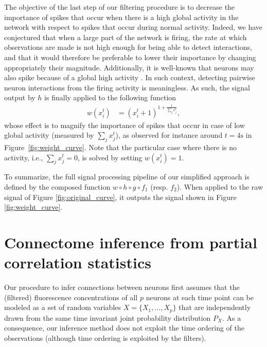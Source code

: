 \documentclass[wcp]{jmlr}
\begin{document}
The objective of the last step of our filtering procedure is to decrease the
importance of spikes that occur when there is a high global activity in the
network with respect to  spikes that occur during normal activity. Indeed, we
have conjectured that when a large part of the network is firing, the rate at
which observations are made is not high enough for being able to detect
interactions, and that it would therefore be preferable to lower their
importance by changing appropriately their magnitude. Additionally, it is
well-known that neurons may also spike because of a global high activity
\citep{stetter2012model}. In such  context, detecting pairwise neuron
interactions from the firing activity is meaningless. As such,
the signal output by $h$ is finally applied to the following function
\begin{align}
 w(x^{t}_i) &= (x^{t}_i + 1 )^{1 + \frac{1}{\sum_{j} x^{t}_j}}, \label{eq:magnify-filter}
\end{align}
whose effect is to magnify the importance of spikes that occur in case of low
global activity (measured by $\sum_{j} x^{t}_j$), as observed for instance
around $t=4\text{s}$ in Figure~\ref{fig:weight_curve}. Note that the particular case where there
is no activity, i.e., $\sum_{j} x^{t}_j = 0$, is solved by setting $w(x^{t}_i)
= 1$.

To summarize, the full signal processing pipeline of our simplified approach is defined by the composed function $w \circ h \circ g \circ
f_1$ (resp. $f_2$). When applied to the raw signal of Figure
\ref{fig:original_curve}, it outputs the signal shown in Figure
\ref{fig:weight_curve}.


\section{Connectome inference from partial correlation statistics}
\label{sec:inference}


Our procedure to infer connections between neurons first assumes that
the (filtered) fluorescence concentrations of all $p$ neurons at each
time point can be modeled as a set of random variables $X = \{X_1,
\dots, X_p\}$ that are independently drawn from the same time invariant
joint probability distribution $P_X$. %
As a consequence, our inference method does not exploit the time
ordering of the observations (although time ordering is exploited by
the filters).
\end{document}
